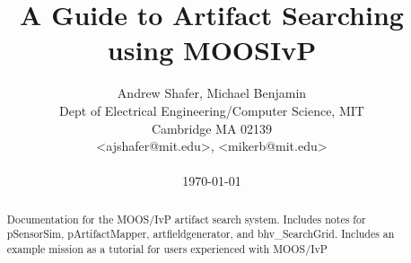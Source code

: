 \documentclass[conference]{IEEEtran}
\begin{document}
\newlength{\pin}
\setlength{\pin}{0.2in}
\newcommand{\email}[1]{\textless #1\textgreater}
\newcommand{\img}[4][width=\linewidth]
{
\begin{figure}[ht]
\centering
\texttt{[image: \#2]}
\caption{#3}
\label{#4}
\end{figure}
}
\newcommand{\bhvsg}{bhv\_SearchGrid}

\newenvironment{hangpar}[1]{\list{}{
    \setlength{\listparindent}{1.5em}       \setlength{\itemindent}{0pt}
    \setlength{\itemsep}{0pt}               \setlength{\parindent}{0pt}
    \setlength{\rightmargin}{0pt}           \setlength{\leftmargin}{#1}
               \parsep                                 \medskipamount}%
    \item\hspace{-\leftmargin}\noindent\ignorespaces}
    {\endlist}


\title{A Guide to Artifact Searching using MOOSIvP}


\author{Andrew Shafer, Michael Benjamin \\
Dept of Electrical Engineering/Computer Science, MIT \\
Cambridge MA 02139 \\
\email{ajshafer@mit.edu}, \email{mikerb@mit.edu} \\ \\
{\Large{\today}}}
\maketitle



\begin{abstract}
Documentation for the MOOS/IvP artifact search system.  Includes notes for pSensorSim, pArtifactMapper, artfieldgenerator, and bhv\_SearchGrid.  Includes an example mission as a tutorial for users experienced with MOOS/IvP
\end{abstract}











\small
 


\newpage
\appendices

%
%
\end{document}
